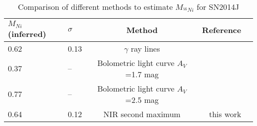 \begin{table*}
\begin{center}
\caption{Comparison of different methods to estimate $M_{^{56}Ni}$ for SN2014J}
\begin{tabular}{llcrr}
\hline
 $M_{Ni}$ (inferred) & $\sigma$ & Method & Reference\\
\hline
0.62	& 0.13 & $\gamma$ ray lines & \citet{Churazov2014} \\
0.37	& -- & Bolometric light curve $A_V$=1.7 mag &  \citet{Churazov2014, Margutti2014} \\
0.77	& -- & Bolometric light curve $A_V$=2.5 mag & \citet{Churazov2014, Goobar2014} \\
0.64	& 0.12 & NIR second maximum & this work \\

\hline
\end{tabular}
\end{center}
\label{tab:meth}
\end{table*}
